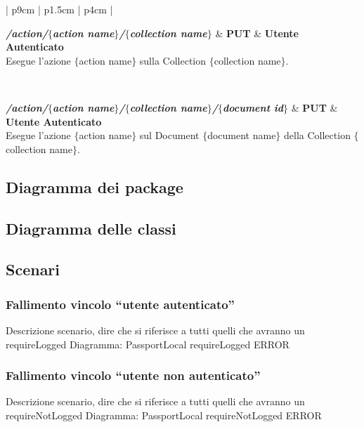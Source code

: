 \begin{center}
\begin{longtable}{| p{9cm} | p{1.5cm} | p{4cm} |}
	 {} \\ \hline
	
	\textbf{\emph{/action/$\{$action name$\}$/$\{$collection name$\}$}} & \textbf{PUT} & \textbf{Utente Autenticato} \\ \hline
	 {Esegue l'azione $\{$action name$\}$ sulla Collection $\{$collection name$\}$.}  \\ 
	\specialrule{1pt}{1pt}{1pt}
	
	 {} \\ \hline
	
	\textbf{\emph{/action/$\{$action name$\}$/$\{$collection name$\}$/$\{$document id$\}$}} & \textbf{PUT} & \textbf{Utente Autenticato} \\ \hline
	 {Esegue l'azione $\{$action name$\}$ sul Document $\{$document name$\}$ della Collection 
	$\{$collection name$\}$.}  \\ 
	\specialrule{1pt}{1pt}{1pt}

	
\end{longtable}
	  \egroup
\end{center}

\subsection{Diagramma dei package}

\subsection{Diagramma delle classi}

\subsection{Scenari}

\subsubsection{Fallimento vincolo ``utente autenticato''}
Descrizione scenario, dire che si riferisce a tutti quelli che avranno un requireLogged
Diagramma: PassportLocal requireLogged ERROR

\subsubsection{Fallimento vincolo ``utente non autenticato''}
Descrizione scenario, dire che si riferisce a tutti quelli che avranno un requireNotLogged
Diagramma: PassportLocal requireNotLogged ERROR

